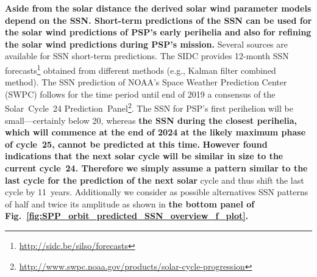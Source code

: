 \textbf{Aside from the solar distance the derived solar wind parameter models depend on the SSN. Short-term predictions of the SSN can be used for the solar wind predictions of PSP's early perihelia and also for refining the solar wind predictions during PSP's mission.} Several sources are available for SSN short-term predictions. The SIDC provides 12-month SSN forecasts\footnote{\url{http://sidc.be/silso/forecasts}} obtained from different methods (e.g., Kalman filter combined method). The SSN prediction of NOAA's Space Weather Prediction Center (SWPC) follows for the time period until end of 2019 a consensus of the Solar~Cycle~24 Prediction~Panel\footnote{\url{http://www.swpc.noaa.gov/products/solar-cycle-progression}}.
The SSN for PSP's first perihelion will be small---certainly below 20, whereas \textbf{the SSN during the closest perihelia, which will commence at the end of 2024 at the likely maximum phase of cycle~25, cannot be predicted at this time.} \textbf{However \citet{Hathaway2016} found indications that the next solar cycle will be similar in size to the current cycle~24. Therefore we simply assume a pattern similar to the last cycle for the prediction of the next solar} cycle and thus shift the last cycle by 11~years. Additionally we consider as possible alternatives SSN patterns of half and twice its amplitude as shown in \textbf{the bottom panel of Fig.~\ref{fig:SPP_orbit_predicted_SSN_overview_f_plot}.}

